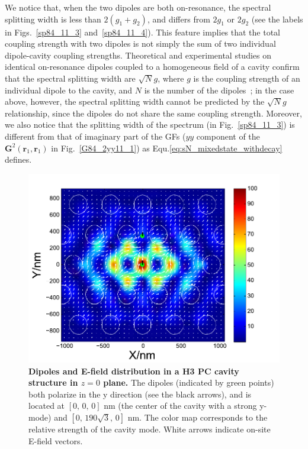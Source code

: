 We notice that, when the two dipoles are both on-resonance, the spectral splitting width is less than $2(g_1+g_2)$, and differs from $2g_1$ or $2g_2$ (see the labels in Figs.~\ref{sp84_11_3} and~\ref{sp84_11_4}). This feature implies that the total coupling strength with two dipoles is not simply the sum of two individual dipole-cavity coupling strengths. Theoretical and experimental studies on identical on-resonance dipoles coupled to a homogeneous field of a cavity confirm that the spectral splitting width are $\sqrt{N}g$, where $g$ is the coupling strength of an individual dipole to the cavity, and $N$ is the number of the dipoles~\cite{Kimble1998,Tischler2007}; in the case above, however, the spectral splitting width cannot be predicted by the $\sqrt{N}g$ relationship, since the dipoles do not share the same coupling strength.  Moreover, we also notice that the splitting width of the spectrum (in Fig.~\ref{sp84_11_3}) is different from that of imaginary part of the GFs ($yy$ component of the $\mathbf{G}^2(\mathbf{r}_1,\mathbf{r}_1)$ in Fig.~\ref{G84_2yy11_1}) as Equ.\eqref{eq:sN_mixedstate_withdecay} defines.
\begin{figure}[H]
\centering
\begin{center}
\includegraphics[width=14cm]{./Figs/dotsmode2_1}
\end{center}
\caption[Dipoles and E-field distribution in a H3 PC cavity structure.]{\textbf{  Dipoles and E-field distribution in a H3 PC cavity structure in $z=0$ plane.}  The dipoles (indicated by green points) both polarize in the y direction (see the black arrows), and is located at $[0,\, 0,\, 0]$ nm (the center of the cavity with a strong y-mode) and $[0,\, 190\sqrt{3},\, 0]$ nm. The color map corresponds to the relative strength of the cavity mode. White arrows indicate on-site E-field vectors.}
\label{dotsmode2_1}
\end{figure}


